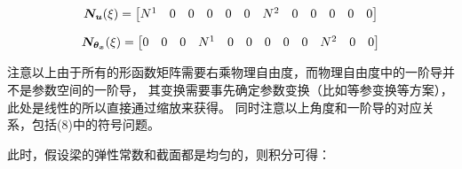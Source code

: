 \documentclass[UTF8,c5size]{ctexart}
\begin{document}
\begin{equation}
    \bm{N_{u}}(\xi) = 
    \addtocounter{MaxMatrixCols}{40}
    \begin{bmatrix}
        N^1&0&0&0&0&0&N^2&0&0&0&0&0
    \end{bmatrix}
\end{equation}

\begin{equation}
    \bm{N_{\theta_x}}(\xi) = 
    \addtocounter{MaxMatrixCols}{40}
    \begin{bmatrix}
        0&0&0&N^1&0&0&0&0&0&N^2&0&0
    \end{bmatrix}
\end{equation}

注意以上由于所有的形函数矩阵需要右乘物理自由度，而物理自由度中的一阶导并不是参数空间的一阶导，
其变换需要事先确定参数变换（比如等参变换等方案），此处是线性的所以直接通过缩放来获得。
同时注意以上角度和一阶导的对应关系，包括(8)中的符号问题。

此时，假设梁的弹性常数和截面都是均匀的，则积分可得：
\end{document}
